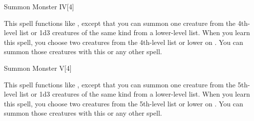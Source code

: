 \begin{spellsection}{Summon Monster IV}[4]
    \begin{spellheader}
    \end{spellheader}
    \begin{spellcontent}
        \begin{spelltargetinginfo}
        \end{spelltargetinginfo}
        \begin{spelleffects}
            \spellspecial This spell functions like , except that you can summon one creature from the 4th-level list or 1d3 creatures of the same kind from a lower-level list. When you learn this spell, you choose two creatures from the 4th-level list or lower on . You can summon those creatures with this or any other  spell.
            \spelldur \durshort \dismissable
        \end{spelleffects}
    \end{spellcontent}
    \begin{spellfooter}
        \miscastexplode
    \end{spellfooter}
\end{spellsection}

\begin{spellsection}{Summon Monster V}[4]
    \begin{spellheader}
    \end{spellheader}
    \begin{spellcontent}
        \begin{spelltargetinginfo}
        \end{spelltargetinginfo}
        \begin{spelleffects}
            \spellspecial This spell functions like , except that you can summon one creature from the 5th-level list or 1d3 creatures of the same kind from a lower-level list. When you learn this spell, you choose two creatures from the 5th-level list or lower on . You can summon those creatures with this or any other  spell.
            \spelldur \durshort \dismissable
        \end{spelleffects}
    \end{spellcontent}
    \begin{spellfooter}
        \miscastexplode
    \end{spellfooter}
\end{spellsection}

